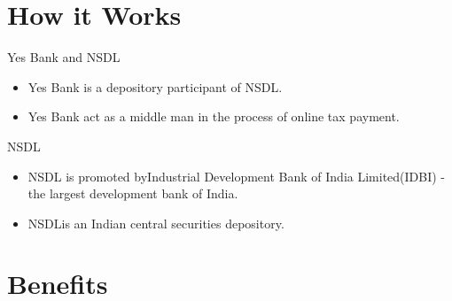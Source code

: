 \documentclass{ctexbeamer}
\begin{document}
  
  \section{How it Works}
  
  \begin{frame}{Yes Bank and NSDL}
  
  \begin{itemize}
    \item Yes Bank is a depository participant of NSDL.
  
    \item Yes Bank act as a middle man in the process of online tax payment.
  
  \end{itemize}
  
  \vskip 1cm
  \end{frame}
  
  \begin{frame}{NSDL}
  
  \begin{itemize}
    \item NSDL is promoted byIndustrial Development Bank of India Limited(IDBI) - the largest development bank of India.
  \item NSDLis an Indian central securities depository.
  
  \end{itemize}
  \vskip 1cm
  
  \end{frame}
  
  
  
  \section{Benefits}
  
\end{document}
